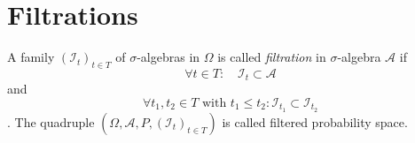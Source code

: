 \documentclass[12pt]{article}
\begin{document}
\newpage
\appendix
\section{Filtrations}
A family $(\mathscr{I}_t)_{t \in T}$ of $\sigma$-algebras in $\Omega$ is called \textit{filtration} in $\sigma$-algebra $\mathscr{A}$ if
\[\forall t \in T: \quad \mathscr{I}_t \subset \mathscr{A}\] and
\[\forall t_1, t_2 \in T \text{ with } t_1 \leq t_2 : \mathscr{I}_{t_1}\subset \mathscr{I}_{t_2}\].
The quadruple $(\Omega , \mathscr{A}, P, (\mathscr{I}_t)_{t \in T})$ is called filtered probability space.
\end{document}
